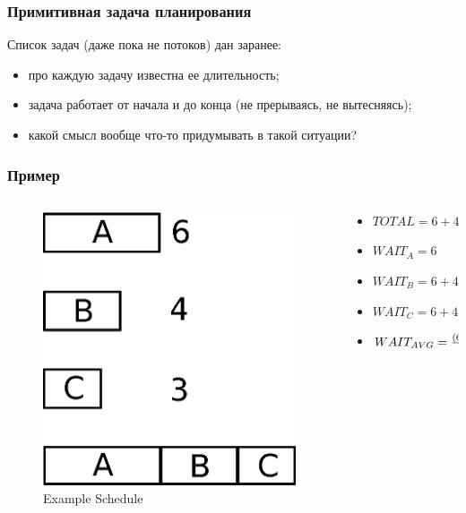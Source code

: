 \begin{frame}
\frametitle{Примитивная задача планирования}

Список задач (даже пока не потоков) дан заранее:
\begin{itemize}
  \item<2-> про каждую задачу известна ее длительность;
  \item<3-> задача работает от начала и до конца (не прерываясь, не вытесняясь);
  \item<4-> какой смысл вообще что-то придумывать в такой ситуации?
\end{itemize}
\end{frame}

\begin{frame}
\frametitle{Пример}

\begin{columns}[T]
  \begin{column}{.4\textwidth}
    \begin{figure}
      \centering\includegraphics[width=.9\linewidth]{sched0}
      \caption{Example Schedule}
    \end{figure}
  \end{column}
  \begin{column}{.6\textwidth}
    \begin{itemize}
      \item<2-> $TOTAL = 6 + 4 + 3 = 13$
      \item<3-> $WAIT_A = 6$
      \item<3-> $WAIT_B = 6 + 4 = 10$
      \item<3-> $WAIT_C = 6 + 4 + 3 = 13$
      \item<4-> $WAIT_{AVG} = {\left(6 + 10 + 13\right)\over 3} = 9.\left(6\right)$
    \end{itemize}
  \end{column}
\end{columns}
\end{frame}

